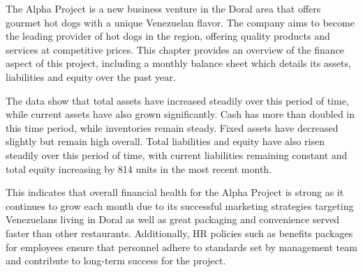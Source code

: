 

The Alpha Project is a new business venture in the Doral area that offers gourmet hot dogs with a unique Venezuelan flavor. The company aims to become the leading provider of hot dogs in the region, offering quality products and services at competitive prices. This chapter provides an overview of the finance aspect of this project, including a monthly balance sheet which details its assets, liabilities and equity over the past year. 

The data show that total assets have increased steadily over this period of time, while current assets have also grown significantly. Cash has more than doubled in this time period, while inventories remain steady. Fixed assets have decreased slightly but remain high overall. Total liabilities and equity have also risen steadily over this period of time, with current liabilities remaining constant and total equity increasing by 814 units in the most recent month. 

This indicates that overall financial health for the Alpha Project is strong as it continues to grow each month due to its successful marketing strategies targeting Venezuelans living in Doral as well as great packaging and convenience served faster than other restaurants. Additionally, HR policies such as benefits packages for employees ensure that personnel adhere to standards set by management team and contribute to long-term success for the project.